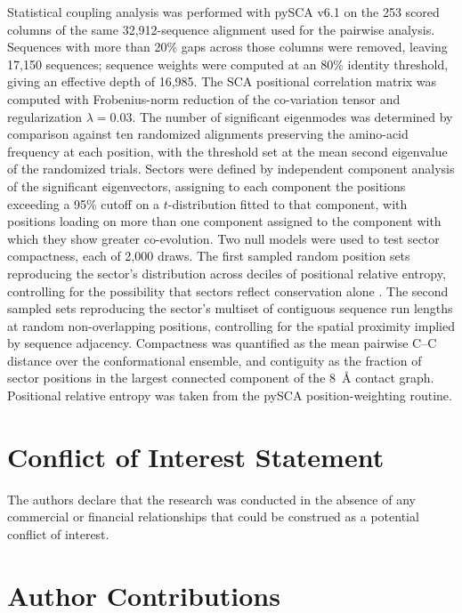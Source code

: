 \documentclass[utf8]{FrontiersinHarvard}
\begin{document}
Statistical coupling analysis was performed with pySCA v6.1 \citep{Rivoire2016} on the 253 scored columns of the same 32,912-sequence alignment used for the pairwise analysis. Sequences with more than 20\% gaps across those columns were removed, leaving 17,150 sequences; sequence weights were computed at an 80\% identity threshold, giving an effective depth of 16,985. The SCA positional correlation matrix was computed with Frobenius-norm reduction of the co-variation tensor and regularization $\lambda = 0.03$. The number of significant eigenmodes was determined by comparison against ten randomized alignments preserving the amino-acid frequency at each position, with the threshold set at the mean second eigenvalue of the randomized trials. Sectors were defined by independent component analysis of the significant eigenvectors, assigning to each component the positions exceeding a 95\% cutoff on a $t$-distribution fitted to that component, with positions loading on more than one component assigned to the component with which they show greater co-evolution. Two null models were used to test sector compactness, each of 2,000 draws. The first sampled random position sets reproducing the sector's distribution across deciles of positional relative entropy, controlling for the possibility that sectors reflect conservation alone \citep{Tesileanu2015}. The second sampled sets reproducing the sector's multiset of contiguous sequence run lengths at random non-overlapping positions, controlling for the spatial proximity implied by sequence adjacency. Compactness was quantified as the mean pairwise C\textalpha{}--C\textalpha{} distance over the conformational ensemble, and contiguity as the fraction of sector positions in the largest connected component of the 8~\AA{} contact graph. Positional relative entropy was taken from the pySCA position-weighting routine.

\section*{Conflict of Interest Statement}

The authors declare that the research was conducted in the absence of any commercial or financial relationships that could be construed as a potential conflict of interest.

\section*{Author Contributions}
\end{document}
